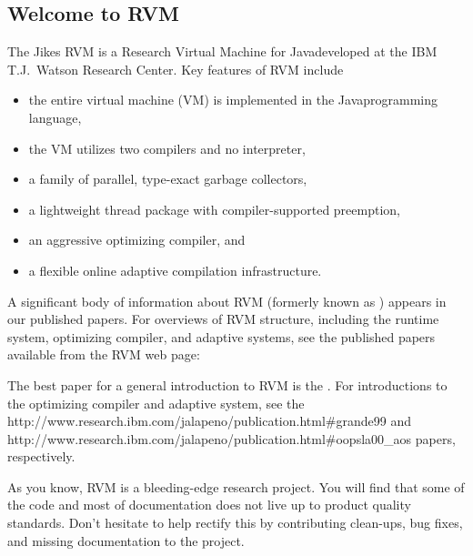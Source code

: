 \subsection {Welcome to RVM}

The Jikes RVM is a Research Virtual Machine for Java\trademark developed at the IBM T.J.\ Watson Research Center.  Key features of RVM include 
\begin{itemize}
\item the entire virtual machine (VM) is implemented in the
  Java\trademark  programming language,
\item the VM utilizes two compilers and no interpreter,
\item a family of parallel, type-exact garbage collectors,
\item a lightweight thread package with compiler-supported preemption,
\item an aggressive optimizing compiler, and 
\item a flexible online adaptive compilation infrastructure.
\end{itemize}

A significant body of information about RVM (formerly known as \jp) appears 
in our published
papers.  For overviews of RVM structure, including the runtime system,
optimizing compiler, and adaptive systems, see the published papers
available from the RVM web page:
\begin{quote}
\end{quote}

The best paper for a general introduction to RVM is 
the 
.  
For introductions to the
optimizing compiler and adaptive system, see the 
{http://www.research.ibm.com/jalapeno/publication.html\#grande99}
 and 
{http://www.research.ibm.com/jalapeno/publication.html\#oopsla00\_aos}  
papers, respectively.

As you know, RVM is a bleeding-edge research project.  You will find that
some of the code and most of documentation does not live up to product  
quality standards. Don't hesitate to help rectify this by
contributing clean-ups, bug fixes, and missing documentation to 
the project.  
